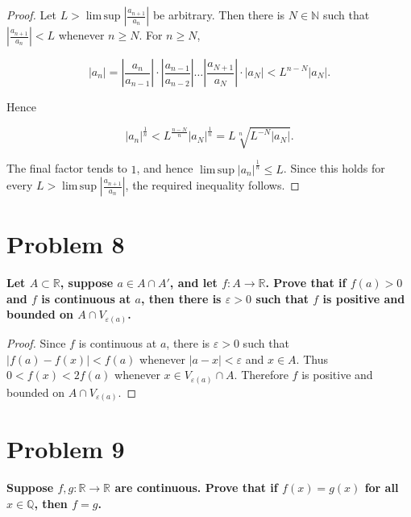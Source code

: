 \begin{proof}

Let \(L > \operatorname{lim\, sup}\left| \frac{a_{n + 1}}{a_{n}} \right|\) be arbitrary. Then there is \(N \in \mathbb{N}\) such that \(\left| \frac{a_{n + 1}}{a_{n}} \right| < L\) whenever \(n \geq N\). For \(n \geq N\),

\[\left| a_{n} \right| = \left| \frac{a_{n}}{a_{n - 1}} \right| \cdot \left| \frac{a_{n - 1}}{a_{n - 2}} \right|\ldots\left| \frac{a_{N + 1}}{a_{N}} \right| \cdot \left| a_{N} \right| < L^{n - N}\left| a_{N} \right|.\]

Hence

\[\left| a_{n} \right|^{\frac{1}{n}} < L^{\frac{n - N}{n}}\left| a_{N} \right|^{\frac{1}{n}} = L\sqrt[n]{L^{- N}\left| a_{N} \right|}.\]

The final factor tends to \(1\), and hence \(\operatorname{lim\, sup}\left| a_{n} \right|^{\frac{1}{n}} \leq L\). Since this holds for every \(L > \operatorname{lim\, sup}\left| \frac{a_{n + 1}}{a_{n}} \right|\), the required inequality follows.

\end{proof}

\section{Problem 8}

\textbf{Let \(A \subset \mathbb{R}\), suppose \(a \in A \cap A'\), and let \(f:A\rightarrow\mathbb{R}\). Prove that if \(f(a) > 0\) and \(f\) is continuous at \(a\), then there is \(\varepsilon > 0\) such that \(f\) is positive and bounded on \(A \cap V_{\varepsilon{(a)}}\).}

\begin{proof}

Since \(f\) is continuous at \(a\), there is \(\varepsilon > 0\) such that \(\left| {f(a) - f(x)} \right| < f(a)\) whenever \(\left| {a - x} \right| < \varepsilon\) and \(x \in A\). Thus \(0 < f(x) < 2f(a)\) whenever \(x \in V_{\varepsilon{(a)}} \cap A\). Therefore \(f\) is positive and bounded on \(A \cap V_{\varepsilon{(a)}}\).

\end{proof}

\section{Problem 9}

\textbf{Suppose \(f,g:\mathbb{R}\rightarrow\mathbb{R}\) are continuous. Prove that if \(f(x) = g(x)\) for all \(x \in \mathbb{Q}\), then \(f = g\).}

